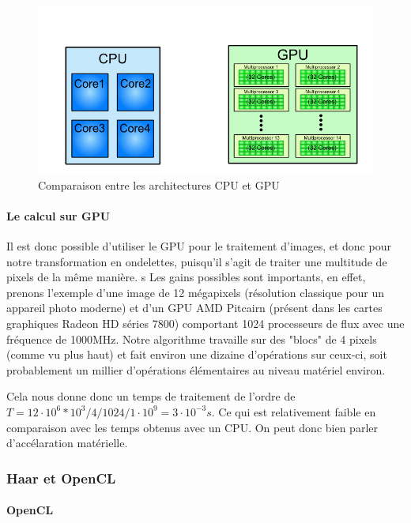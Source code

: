 \begin{figure}[!h]
\centering
\includegraphics[scale=0.5]{images/cpugpu.png}
\caption{Comparaison entre les architectures CPU et GPU}
\label{cpugpu}
\end{figure}

\clearpage

\paragraph{Le calcul sur GPU}

Il est donc possible d'utiliser le GPU pour le traitement d'images, et donc pour notre transformation en ondelettes, puisqu'il s'agit de traiter une multitude de pixels de la même manière.
s
Les gains possibles sont importants, en effet, prenons l'exemple d'une image de 12 mégapixels (résolution classique pour un appareil photo moderne) et d'un GPU AMD Pitcairn (présent dans les cartes graphiques Radeon HD séries 7800) comportant 1024 processeurs de flux avec une fréquence de 1000MHz. Notre algorithme travaille sur des "blocs" de 4 pixels (comme vu plus haut) et fait environ une dizaine d'opérations sur ceux-ci, soit probablement un millier d'opérations élémentaires au niveau matériel environ.

Cela nous donne donc un temps de traitement de l'ordre de $T = 12\cdot{}10^6 * 10^3 / 4 / 1024 / 1\cdot{}10^9 = 3\cdot{}10^{-3} s$. Ce qui est relativement faible en comparaison avec les temps obtenus avec un CPU. On peut donc bien parler d'accélaration matérielle.

\subsubsection{Haar et OpenCL}

\paragraph{OpenCL}

